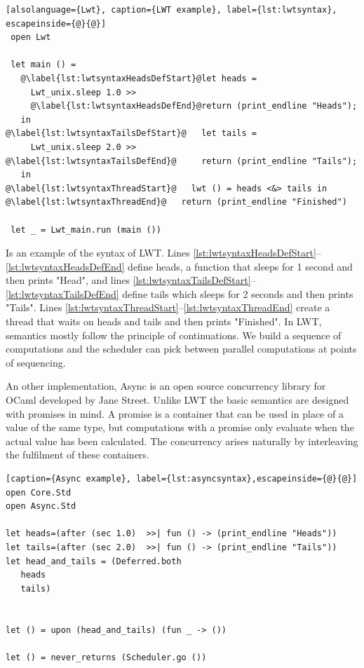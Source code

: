 \documentclass[12pt,twoside,notitlepage]{report}
\theoremstyle{plain}%
\theoremstyle{definition}
\theoremstyle{remark}
\begin{document}
\begin{minipage}{\linewidth}

\begin{lstlisting}[alsolanguage={Lwt}, caption={LWT example}, label={lst:lwtsyntax}, escapeinside={@}{@}]
 open Lwt
 
 let main () =
   @\label{lst:lwtsyntaxHeadsDefStart}@let heads =
     Lwt_unix.sleep 1.0 >>
     @\label{lst:lwtsyntaxHeadsDefEnd}@return (print_endline "Heads");
   in
@\label{lst:lwtsyntaxTailsDefStart}@   let tails =
     Lwt_unix.sleep 2.0 >>
@\label{lst:lwtsyntaxTailsDefEnd}@     return (print_endline "Tails");
   in
@\label{lst:lwtsyntaxThreadStart}@   lwt () = heads <&> tails in
@\label{lst:lwtsyntaxThreadEnd}@   return (print_endline "Finished")
 
 let _ = Lwt_main.run (main ())
\end{lstlisting}

\end{minipage}



Is  an example of the syntax of LWT. Lines \ref{lst:lwtsyntaxHeadsDefStart}--\ref{lst:lwtsyntaxHeadsDefEnd} define heads, a function that sleeps for 1 second and then prints "Head", and lines \ref{lst:lwtsyntaxTailsDefStart}--\ref{lst:lwtsyntaxTailsDefEnd} define tails which sleeps for 2 seconds and then prints "Tails".  Lines \ref{lst:lwtsyntaxThreadStart}--\ref{lst:lwtsyntaxThreadEnd} create a thread that waits on heads and tails and then prints "Finished".  In LWT, semantics mostly follow the principle of continuations. We build a sequence of computations and the scheduler can pick between parallel computations at points of sequencing.

An other implementation, Async is an open source concurrency library for OCaml developed by Jane Street. Unlike LWT the basic semantics are designed with promises in mind. A promise is a container that can be used in place of a value of the same type, but computations with a promise only evaluate when the actual value has been calculated. The concurrency arises naturally by interleaving the fulfilment of these containers. 


\begin{minipage}{\linewidth}

\begin{lstlisting}[caption={Async example}, label={lst:asyncsyntax},escapeinside={@}{@}]
open Core.Std
open Async.Std

let heads=(after (sec 1.0)  >>| fun () -> (print_endline "Heads"))
let tails=(after (sec 2.0)  >>| fun () -> (print_endline "Tails"))
let head_and_tails = (Deferred.both
   heads
   tails)


let () = upon (head_and_tails) (fun _ -> ())
  
let () = never_returns (Scheduler.go ())
\end{lstlisting}

\end{minipage}
\end{document}
